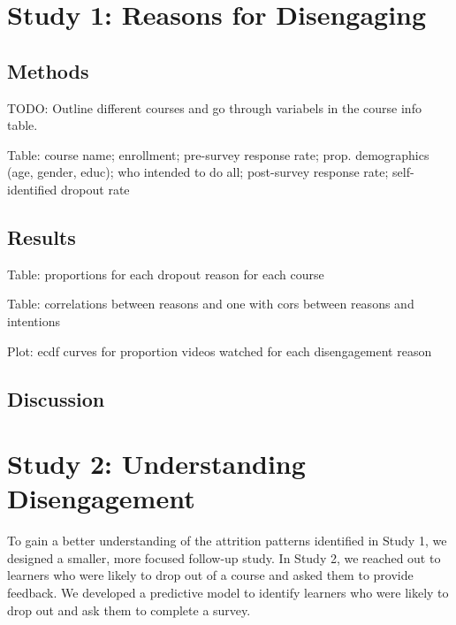 \documentclass{sigchi}\usepackage[]{graphicx}\usepackage[]{color}
\begin{document}
\section{Study 1: Reasons for Disengaging}



\subsection{Methods}

TODO: Outline different courses and go through variabels in the course info table.

Table:  course name; enrollment; pre-survey response rate; prop. demographics (age, gender, educ); who intended to do all; post-survey response rate; self-identified dropout rate


\subsection{Results}

Table: proportions for each dropout reason for each course

Table: correlations between reasons and one with cors between reasons and intentions

Plot: ecdf curves for proportion videos watched for each disengagement reason


\subsection{Discussion}


\section{Study 2: Understanding Disengagement}

To gain a better understanding of the attrition patterns identified in Study 1, we designed a smaller, more focused follow-up study. In Study 2, we reached out to learners who were likely to drop out of a course and asked them to provide feedback. We developed a predictive model to identify learners who were likely to drop out and ask them to complete a survey.
\end{document}
